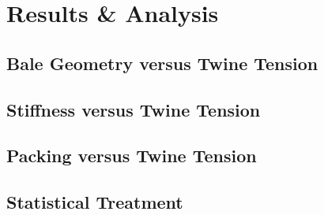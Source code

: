 \section{Results \& Analysis}

\subsection{Bale Geometry versus Twine Tension}

\subsection{Stiffness versus Twine Tension}

\subsection{Packing versus Twine Tension}

\subsection{Statistical Treatment}

